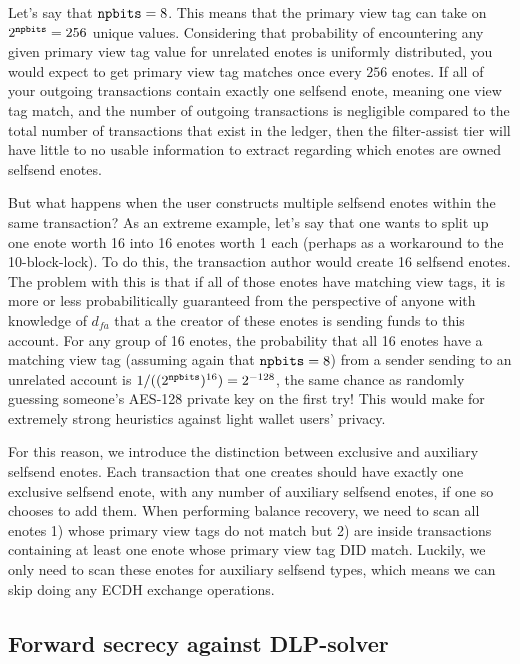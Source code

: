 Let's say that ${\tt npbits} = 8$. This means that the primary view tag can take on $2^{\tt npbits} = 256$ unique values. Considering that probability of encountering any given primary view tag value for unrelated enotes is uniformly distributed, you would expect to get primary view tag matches once every $256$ enotes. If all of your outgoing transactions contain exactly one selfsend enote, meaning one view tag match, and the number of outgoing transactions is negligible compared to the total number of transactions that exist in the ledger, then the filter-assist tier will have little to no usable information to extract regarding which enotes are owned selfsend enotes.

But what happens when the user constructs multiple selfsend enotes within the same transaction? As an extreme example, let's say that one wants to split up one enote worth 16 into 16 enotes worth 1 each (perhaps as a workaround to the 10-block-lock). To do this, the transaction author would create 16 selfsend enotes. The problem with this is that if all of those enotes have matching view tags, it is more or less probabilitically guaranteed from the perspective of anyone with knowledge of $d_{fa}$ that a the creator of these enotes is sending funds to this account. For any group of 16 enotes, the probability that all 16 enotes have a matching view tag (assuming again that ${\tt npbits}=8$) from a sender sending to an unrelated account is 
$1 / ((2^{\tt npbits})^{16}) = 2^{-128}$, the same chance as randomly guessing someone's AES-128 private key on the first try! This would make for extremely strong heuristics against light wallet users' privacy.

For this reason, we introduce the distinction between exclusive and auxiliary selfsend enotes. Each transaction that one creates should have exactly one exclusive selfsend enote, with any number of auxiliary selfsend enotes, if one so chooses to add them. When performing balance recovery, we need to scan all enotes 1) whose primary view tags do not match but 2) are inside transactions containing at least one enote whose primary view tag DID match. Luckily, we only need to scan these enotes for auxiliary selfsend types, which means we can skip doing any ECDH exchange operations.


\subsection{Forward secrecy against DLP-solver}
\label{subsec:jamtis-forward-secrecy-dlp-solver}

